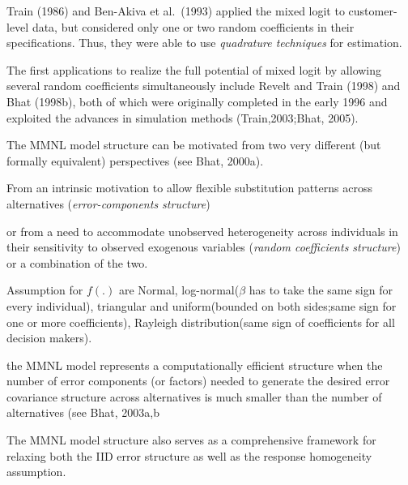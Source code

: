\documentclass[
]{article}
\begin{document}
Train (1986) and Ben-Akiva et al.~(1993) applied the mixed logit to
customer-level data, but considered only one or two random coefficients
in their specifications. Thus, they were able to use \emph{quadrature
techniques} for estimation.

The first applications to realize the full potential of mixed logit by
allowing several random coefficients simultaneously include Revelt and
Train (1998) and Bhat (1998b), both of which were originally completed
in the early 1996 and exploited the advances in simulation methods
(Train,2003;Bhat, 2005).

The MMNL model structure can be motivated from two very different (but
formally equivalent) perspectives (see Bhat, 2000a).

From an intrinsic motivation to allow flexible substitution patterns
across alternatives (\emph{error-components structure})

or from a need to accommodate unobserved heterogeneity across
individuals in their sensitivity to observed exogenous variables
(\emph{random coefficients structure}) or a combination of the two.

Assumption for \(f(.)\) are Normal, log-normal(\(\beta\) has to take the
same sign for every individual), triangular and uniform(bounded on both
sides;same sign for one or more coefficients), Rayleigh
distribution(same sign of coefficients for all decision makers).

the MMNL model represents a computationally efficient structure when the
number of error components (or factors) needed to generate the desired
error covariance structure across alternatives is much smaller than the
number of alternatives (see Bhat, 2003a,b

The MMNL model structure also serves as a comprehensive framework for
relaxing both the IID error structure as well as the response
homogeneity assumption.
\end{document}
